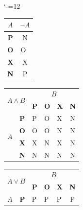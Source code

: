 \documentclass[a4paper, 11pt]{article}
\begin{document}
			\bigskip
			\begin{table}[h]
				\catcode`-=12
				\centering
				\begin{tabular}{|c|c|}
					\hline
					$A$        & $\neg A$ \\ \hline
					\textbf{P} & N        \\ \hline
					\textbf{O} & O~       \\ \hline
					\textbf{X} & X        \\ \hline
					\textbf{N} & P        \\ \hline
				\end{tabular}
				\begin{tabular}{| c | c | c | c | c | c |}
					\hline
					\multicolumn{2}{|l|}{\multirow{2}{*}{$A \wedge B$}}            & \multicolumn{4}{c|}{$B$}                                                                                           \\ \cline{3-6} 
					\multicolumn{2}{|l|}{}                                & \multicolumn{1}{l|}{\textbf{P}} & \multicolumn{1}{l|}{\textbf{O}} & \multicolumn{1}{l|}{\textbf{X}} & \textbf{N} \\ \hline
					\multicolumn{1}{|l|}{\multirow{4}{*}{$A$}} & \textbf{P} & \multicolumn{1}{l|}{P} & \multicolumn{1}{l|}{O} & \multicolumn{1}{l|}{X} & N \\ \cline{2-6} 
					\multicolumn{1}{|l|}{}                     & \textbf{O} & \multicolumn{1}{l|}{O} & \multicolumn{1}{l|}{O} & \multicolumn{1}{l|}{N} & N \\ \cline{2-6} 
					\multicolumn{1}{|l|}{}                     & \textbf{X} & \multicolumn{1}{l|}{X} & \multicolumn{1}{l|}{N} & \multicolumn{1}{l|}{X} & N \\ \cline{2-6} 
					\multicolumn{1}{|l|}{}                     & \textbf{N} & \multicolumn{1}{l|}{N} & \multicolumn{1}{l|}{N} & \multicolumn{1}{l|}{N} & N \\ \hline
				\end{tabular}
				\begin{tabular}{| c | c | c | c | c | c |}
					\hline
					\multicolumn{2}{|l|}{\multirow{2}{*}{$A \lor B$}}            & \multicolumn{4}{c|}{$B$}                                                                                           \\ \cline{3-6} 
					\multicolumn{2}{|l|}{}                                & \multicolumn{1}{l|}{\textbf{P}} & \multicolumn{1}{l|}{\textbf{O}} & \multicolumn{1}{l|}{\textbf{X}} & \textbf{N} \\ \hline
					\multicolumn{1}{|l|}{\multirow{4}{*}{$A$}} & \textbf{P} & \multicolumn{1}{l|}{P} & \multicolumn{1}{l|}{P} & \multicolumn{1}{l|}{P} & P  \\ \cline{2-6} 

\end{tabular}
\end{table}
\end{document}
